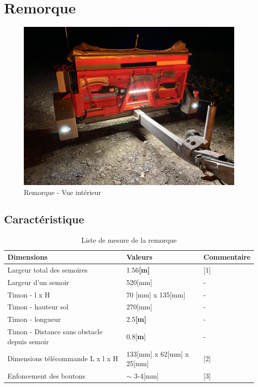 \section{Remorque}
\begin{figure}[H]
    \centering
    \includegraphics[width=12cm]{assets/figures/remorque.jpeg}
    \caption{Remorque - Vue intérieur}
\end{figure}
\subsection{Caractéristique}
\begin{table}[H]
    \begin{center}
        \caption{Liste de mesure de la remorque}
        \begin{tabular}{|l|l|l|}
            Dimensions                                   & Valeurs                   & Commentaire \\ \hline
            Largeur total des semoires                   & 1.56\textbf{[m]}          & [1]         \\
            Largeur d'un semoir                          & 520[mm]                   & -           \\
            Timon - l x H                                & 70 [mm] x 135[mm]         & -           \\
            Timon - hauteur sol                          & 270[mm]                   & -           \\
            Timon - longueur                             & 2.5\textbf{[m]}           & -           \\
            Timon - Distance sans obstacle depuis semoir & 0.8[\textbf{m}]           & -           \\
            Dimensions télécommande L x l x H            & 133[mm] x 62[mm] x 25[mm] & [2]         \\
            Enfoncement des boutons                      & $\sim$ 3-4[mm]            & [3]         \\
        \end{tabular}
    \end{center}
\end{table}

